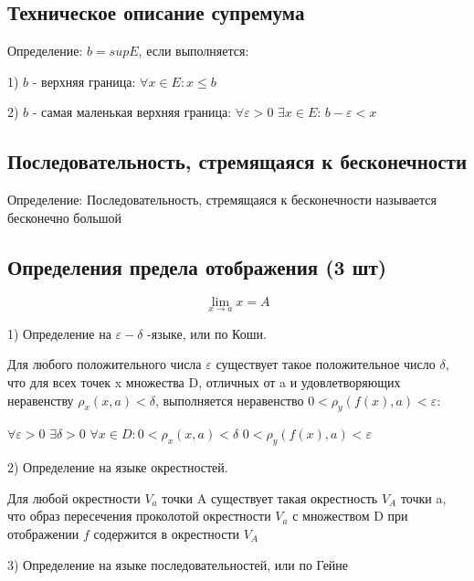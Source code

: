 \newpage
\subsection{Техническое описание супремума}

Определение: $b = sup E$, если выполняется:

	1) $b$ - верхняя граница: $\forall x \in E: x \leq b$
	
	2) $b$ - самая маленькая верхняя граница: $\forall \varepsilon > 0$ $\exists x \in E$: $b - \varepsilon < x$

\newpage
{}
\subsection{Последовательность, стремящаяся к бесконечности}
Определение: Последовательность, стремящаяся к бесконечности называется бесконечно большой

\newpage
\subsection{Определения предела отображения (3 шт)}
$$\lim_{x \to a}x = A$$

1) Определение на $\varepsilon - \delta$ -языке, или по Коши.

Для любого положительного числа $\varepsilon$ существует такое положительное число $\delta$, что для всех точек x множества D, отличных от a и удовлетворяющих неравенству $\rho_x (x, a) < \delta$, выполняется неравенство 
$0 < \rho_y (f(x), a) < \varepsilon$:

 $\forall \varepsilon > 0$  $ \exists \delta > 0 $ $ \forall x \in D : 0 < \rho_x (x, a) < \delta$ $0 < \rho_y (f(x), a) < \varepsilon$

2) Определение на языке окрестностей.

Для любой окрестности 
$V_a$ точки A существует такая окрестность $V_A$ точки a, что образ пересечения проколотой окрестности $V_a$ с множеством D 
при отображении $f$ содержится в окрестности $V_A$

3) Определение на языке последовательностей, или по Гейне

